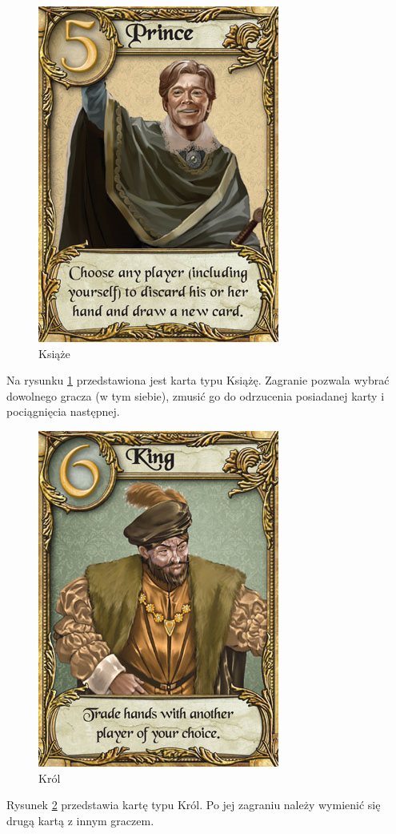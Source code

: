\clearpage
\begin{figure}[h]
	\centering
	\includegraphics[scale=0.5]{Resources/Love_Letter_Card_Prince.png}
	\caption{Książe} \label{fig:Love_Letter_Card_Prince}
\end{figure}
Na rysunku \ref{fig:Love_Letter_Card_Prince} przedstawiona jest karta typu Książę. Zagranie pozwala wybrać dowolnego gracza (w tym siebie), zmusić go do odrzucenia posiadanej karty i pociągnięcia następnej.

\begin{figure}[h]
	\centering
	\includegraphics[scale=0.5]{Resources/Love_Letter_Card_King.png}
	\caption{Król} \label{fig:Love_Letter_Card_King}
\end{figure}
Rysunek \ref{fig:Love_Letter_Card_King} przedstawia kartę typu Król. Po jej zagraniu należy wymienić się drugą kartą z innym graczem.

